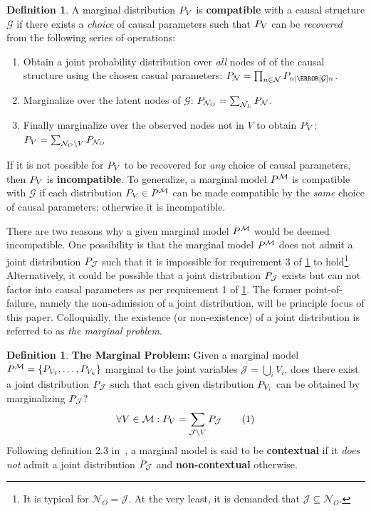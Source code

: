 \documentclass[aps, 10pt, english, twoside, pra, nofootinbib, longbibliography]{revtex4-1}
\theoremstyle{plain}
\theoremstyle{definition}
\newtheorem{definition}[theorem]{Definition}
\theoremstyle{remark}
\newcommand{\graph}{\mathcal{G}}
\newcommand{\nodes}{\mathcal{N}}
\newcommand{\mscenario}{\mathcal{M}}
\newcommand{\jointvar}{\mathcal{J}}
\newcommand{\term}[1]{\textcolor{Mahogany}{\textbf{#1}}}
\begin{document}
    \begin{definition}
        \label{def:compatible}
        A marginal distribution $\prob[V]$ is \term{compatible} with a causal structure $\graph$ if there exists a \textit{choice} of causal parameters such that $\prob[V]$ can be \textit{recovered} from the following series of operations:
        \begin{enumerate}
            \item Obtain a joint probability distribution over \textit{all} nodes of of the causal structure using the chosen casual parameters: $\prob[\nodes] = \prod_{n \in \nodes} \prob[n \mid \Pa[\graph]{n}]$.
            \item Marginalize over the latent nodes of $\graph$: $\prob[\nodes_O] = \sum_{\nodes_L} \prob[\nodes]$.
            \item Finally marginalize over the observed nodes not in $V$ to obtain $\prob[V]$: $\prob[V] = \sum_{\nodes_O \setminus V} \prob[\nodes_O]$
        \end{enumerate}
        If it is not possible for $\prob[V]$ to be recovered for \textit{any} choice of causal parameters, then $\prob[V]$ is \term{incompatible}. To generalize, a marginal model $\prob^{\mscenario}$ is compatible with $\graph$ if each distribution $\prob[V] \in \prob^{\mscenario}$ can be made compatible by the \textit{same} choice of causal parameters; otherwise it is incompatible.
    \end{definition}

    There are two reasons why a given marginal model $\prob^{\mscenario}$ would be deemed incompatible. One possibility is that the marginal model $\prob^{\mscenario}$ does not admit a joint distribution $\prob[\jointvar]$ such that it is impossible for requirement 3 of \cref{def:compatible} to hold\footnote{It is typical for $\nodes_O = \jointvar$. At the very least, it is demanded that $\jointvar \subseteq \nodes_O$.}. Alternatively, it could be possible that a joint distribution $\prob[\jointvar]$ exists but can not factor into causal parameters as per requirement 1 of \cref{def:compatible}. The former point-of-failure, namely the non-admission of a joint distribution, will be principle focus of this paper. Colloquially, the existence (or non-existence) of a joint distribution is referred to as \textit{the marginal problem}.

    \begin{definition}
        \label{def:marginal_problem}
        \term{The Marginal Problem:} Given a marginal model $\prob^{\mscenario} = \bc{\prob[V_1], \ldots, \prob[V_k]}$ marginal to the joint variables $\jointvar = \bigcup_{i} V_i$, does there exist a joint distribution $\prob[\jointvar]$ such that each given distribution $\prob[V_i]$ can be obtained by marginalizing $\prob[\jointvar]$?
        \[ \forall V \in \mscenario : \prob[V] = \sum_{\jointvar \setminus V} \prob[\jointvar] \eq \label{eq:def:marginal_problem}\]
        Following definition 2.3 in~\cite{Fritz_2011}, a marginal model is said to be \term{contextual} if it \textit{does not} admit a joint distribution $\prob[\jointvar]$ and \term{non-contextual} otherwise.
    \end{definition}
\end{document}
